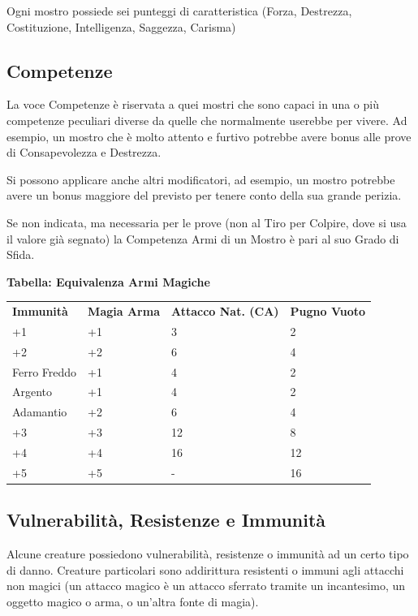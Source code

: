 \begin{multicols}{2}
Ogni mostro possiede sei punteggi di caratteristica (Forza, Destrezza, Costituzione, Intelligenza, Saggezza, Carisma)

\subsection{Competenze}

La voce Competenze è riservata a quei mostri che sono capaci in una o più competenze peculiari diverse da quelle che normalmente userebbe per vivere. Ad esempio, un mostro che è molto attento e furtivo potrebbe avere bonus alle prove di Consapevolezza e Destrezza.

Si possono applicare anche altri modificatori, ad esempio, un mostro potrebbe avere un bonus maggiore del previsto per tenere conto della sua grande perizia.

Se non indicata, ma necessaria per le prove (non al Tiro per Colpire, dove si usa il valore già segnato) la Competenza Armi di un Mostro è pari al suo Grado di Sfida.

\medskip

\textbf{Tabella: Equivalenza Armi Magiche}\label{equivalenzaarmimagiche}\hypertarget{equivalenzaarmimagiche}{}

\medskip

\begin{tabular}{lp{}p{}p{}}
	\toprule
	\textbf{Immunità} & \textbf{Magia Arma} & \textbf{Attacco Nat. (CA)}& \textbf{Pugno Vuoto}\\
	+1 & +1 & 3& 2\\
	+2 & +2 & 6& 4\\
	Ferro Freddo & +1 & 4& 2\\
	Argento & +1 & 4& 2\\
	Adamantio & +2 & 6& 4\\
	+3 & +3 & 12& 8\\
	+4 & +4 & 16& 12\\
	+5 & +5 & - & 16
\end{tabular}

\subsection{Vulnerabilità, Resistenze e Immunità}\label{vulnerabilitaresistenze}
Alcune creature possiedono vulnerabilità, resistenze o immunità ad un certo tipo di danno. Creature particolari sono addirittura resistenti o immuni agli attacchi non magici (un attacco magico è un attacco sferrato tramite un incantesimo, un oggetto magico o arma, o un'altra fonte di magia).


\end{multicols}
